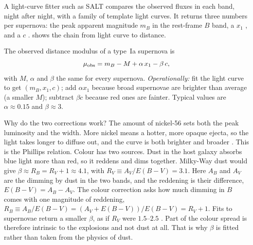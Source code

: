 A light-curve fitter such as SALT \cite[p.~39]{Weinberg2013} compares the observed fluxes in each band, night after night, with a family of template light curves. It returns three numbers per supernova: the peak apparent magnitude $m_B$ in the rest-frame $B$ band, a  $x_1$ , and a  $c$ .  shows the chain from light curve to distance.

\begin{workdef}
The observed distance modulus of a type~Ia supernova is
\begin{equation}
  \mu_{\rm obs}=m_B-M+\alpha\,x_1-\beta\,c ,
  \label{T2b:eq:tripp}
\end{equation}
with $M$, $\alpha$ and $\beta$ the same for every supernova. \emph{Operationally:} fit the light curve to get $(m_B,x_1,c)$; add $\alpha x_1$ because broad supernovae are brighter than average (a smaller $M$); subtract $\beta c$ because red ones are fainter. Typical values are $\alpha\approx0.15$ and $\beta\approx3$.
\end{workdef}

Why do the two corrections work? The amount of nickel-56 sets both the peak luminosity and the width. More nickel means a hotter, more opaque ejecta, so the light takes longer to diffuse out, and the curve is both brighter and broader \cite[p.~33]{Weinberg2013}. This is the Phillips relation. Colour has two sources. Dust in the host galaxy absorbs blue light more than red, so it reddens and dims together. Milky-Way dust would give $\beta\approx R_B=R_V+1\approx4.1$, with $R_V\equiv A_V/E(B-V)=3.1$. Here $A_B$ and $A_V$ are the dimming by dust in the two bands, and the reddening is their difference, $E(B-V)=A_B-A_V$. The colour correction asks how much dimming in $B$ comes with one magnitude of reddening, $R_B\equiv A_B/E(B-V)=(A_V+E(B-V))/E(B-V)=R_V+1$. Fits to supernovae return a smaller $\beta$, as if $R_V$ were $1.5$--$2.5$ \cite[p.~36]{Weinberg2013}. Part of the colour spread is therefore intrinsic to the explosions and not dust at all. That is why $\beta$ is fitted rather than taken from the physics of dust.

